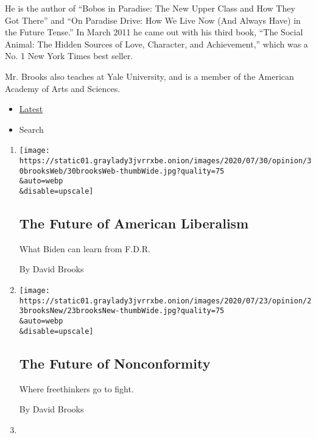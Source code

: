 He is the author of ``Bobos in Paradise: The New Upper Class and How
They Got There'' and ``On Paradise Drive: How We Live Now (And Always
Have) in the Future Tense.'' In March 2011 he came out with his third
book, ``The Social Animal: The Hidden Sources of Love, Character, and
Achievement,'' which was a No. 1 New York Times best seller.

Mr. Brooks also teaches at Yale University, and is a member of the
American Academy of Arts and Sciences.

\begin{itemize}
\tightlist
\item
  \protect\hyperlink{stream-panel}{Latest}
\item
  Search
\end{itemize}

\begin{enumerate}
\def\labelenumi{\arabic{enumi}.}
\item
  \href{/2020/07/30/opinion/biden-fdr.html}{}

  \texttt{[image: https://static01.graylady3jvrrxbe.onion/images/2020/07/30/opinion/30brooksWeb/30brooksWeb-thumbWide.jpg?quality=75\\\&auto=webp\\\&disable=upscale]}

  \hypertarget{the-future-of-american-liberalism}{%
  \subsection{The Future of American
  Liberalism}\label{the-future-of-american-liberalism}}

  What Biden can learn from F.D.R.

  By David Brooks
\item
  \href{/2020/07/23/opinion/substack-newsletters-writers.html}{}

  \texttt{[image: https://static01.graylady3jvrrxbe.onion/images/2020/07/23/opinion/23brooksNew/23brooksNew-thumbWide.jpg?quality=75\\\&auto=webp\\\&disable=upscale]}

  \hypertarget{the-future-of-nonconformity}{%
  \subsection{The Future of
  Nonconformity}\label{the-future-of-nonconformity}}

  Where freethinkers go to fight.

  By David Brooks
\item
  \href{/2020/07/16/opinion/biden-2020.html}{}


\end{enumerate}
